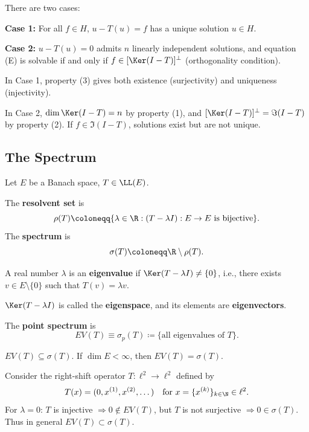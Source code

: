 There are two cases:

\textbf{Case 1:} For all $f \in H$, $u - T(u) = f$ has a unique solution $u \in H$.

\textbf{Case 2:} $u - T(u) = 0$ admits $n$ linearly independent solutions, and equation (E) is solvable if and only if $f \in [\Ker(I - T)]^\perp$ (orthogonality condition).

\begin{remark}
In Case 1, property (3) gives both existence (surjectivity) and uniqueness (injectivity).

In Case 2, $\dim \Ker(I - T) = n$ by property (1), and $[\Ker(I - T)]^\perp = \Im(I - T)$ by property (2). If $f \in \Im(I - T)$, solutions exist but are not unique.
\end{remark}

\clearpage
\subsection{The Spectrum}

Let $E$ be a Banach space, $T \in \LL(E)$.

\begin{definition}
The \textbf{resolvent set} is
\[
\rho(T) \coloneqq \{\lambda \in \R : (T - \lambda I): E \to E \text{ is bijective}\}.
\]
The \textbf{spectrum} is
\[
\sigma(T) \coloneqq \R \setminus \rho(T).
\]
\end{definition}

\begin{definition}
A real number $\lambda$ is an \textbf{eigenvalue} if $\Ker(T - \lambda I) \neq \{0\}$, i.e., there exists $v \in E \setminus \{0\}$ such that $T(v) = \lambda v$.

$\Ker(T - \lambda I)$ is called the \textbf{eigenspace}, and its elements are \textbf{eigenvectors}.

The \textbf{point spectrum} is
\[
EV(T) \equiv \sigma_p(T) \coloneqq \{\text{all eigenvalues of } T\}.
\]
\end{definition}

\begin{remark}
$EV(T) \subseteq \sigma(T)$. If $\dim E < \infty$, then $EV(T) = \sigma(T)$.
\end{remark}

\begin{example}
Consider the right-shift operator $T: \ell^2 \to \ell^2$ defined by
\[
T(x) = (0, x^{(1)}, x^{(2)}, \dots) \quad \text{for } x = \{x^{(k)}\}_{k \in \N} \in \ell^2.
\]
For $\lambda = 0$: $T$ is injective $\Rightarrow 0 \notin EV(T)$, but $T$ is not surjective $\Rightarrow 0 \in \sigma(T)$. Thus in general $EV(T) \subset \sigma(T)$.
\end{example}


